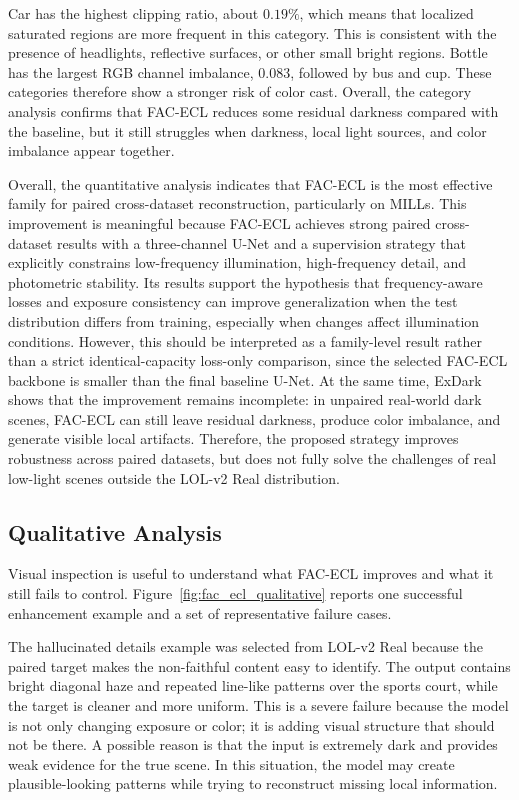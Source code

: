 Car has the highest clipping ratio, about $0.19\%$, which means that localized saturated regions are more frequent in this category. This is consistent with the presence of headlights, reflective surfaces, or other small bright regions. Bottle has the largest RGB channel imbalance, $0.083$, followed by bus and cup. These categories therefore show a stronger risk of color cast. Overall, the category analysis confirms that FAC-ECL reduces some residual darkness compared with the baseline, but it still struggles when darkness, local light sources, and color imbalance appear together.

Overall, the quantitative analysis indicates that FAC-ECL is the most effective family for paired cross-dataset reconstruction, particularly on MILLs. This improvement is meaningful because FAC-ECL achieves strong paired cross-dataset results with a three-channel U-Net and a supervision strategy that explicitly constrains low-frequency illumination, high-frequency detail, and photometric stability. Its results support the hypothesis that frequency-aware losses and exposure consistency can improve generalization when the test distribution differs from training, especially when changes affect illumination conditions. However, this should be interpreted as a family-level result rather than a strict identical-capacity loss-only comparison, since the selected FAC-ECL backbone is smaller than the final baseline U-Net. At the same time, ExDark shows that the improvement remains incomplete: in unpaired real-world dark scenes, FAC-ECL can still leave residual darkness, produce color imbalance, and generate visible local artifacts. Therefore, the proposed strategy improves robustness across paired datasets, but does not fully solve the challenges of real low-light scenes outside the LOL-v2 Real distribution.

\subsection{Qualitative Analysis}

Visual inspection is useful to understand what FAC-ECL improves and what it still fails to control. Figure~\ref{fig:fac_ecl_qualitative} reports one successful enhancement example and a set of representative failure cases.



The hallucinated details example was selected from LOL-v2 Real because the paired target makes the non-faithful content easy to identify. The output contains bright diagonal haze and repeated line-like patterns over the sports court, while the target is cleaner and more uniform. This is a severe failure because the model is not only changing exposure or color; it is adding visual structure that should not be there. A possible reason is that the input is extremely dark and provides weak evidence for the true scene. In this situation, the model may create plausible-looking patterns while trying to reconstruct missing local information.

